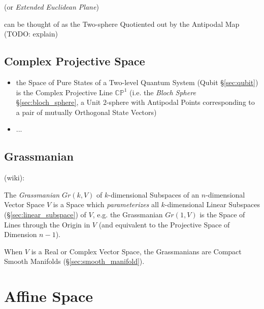 (or \emph{Extended Euclidean Plane})

can be thought of as the Two-sphere Quotiented out by the Antipodal Map (TODO:
explain)



\subsection{Complex Projective Space}\label{sec:complex_projective_space}

\begin{itemize}
  \item the Space of Pure States of a Two-level Quantum System (Qubit
    \S\ref{sec:qubit}) is the Complex Projective Line $\mathbb{CP}^1$ (i.e. the
    \emph{Bloch Sphere} \S\ref{sec:bloch_sphere}, a Unit $2$-sphere with
    Antipodal Points corresponding to a pair of mutually Orthogonal State
    Vectors)
  \item ...
\end{itemize}



\subsection{Grassmanian}\label{sec:grassmanian}

(wiki):

The \emph{Grassmanian} $Gr(k,V)$ of $k$-dimensional Subspaces of an
$n$-dimensional Vector Space $V$ is a Space which \emph{parameterizes} all
$k$-dimensional Linear Subspaces (\S\ref{sec:linear_subspace}) of $V$, e.g.
the Grassmanian $Gr(1,V)$ is the Space of Lines through the Origin in $V$ (and
equivalent to the Projective Space of Dimension $n-1$).

When $V$ is a Real or Complex Vector Space, the Grassmanians are Compact Smooth
Manifolds (\S\ref{sec:smooth_manifold}).



\section{Affine Space}\label{sec:affine_space}

